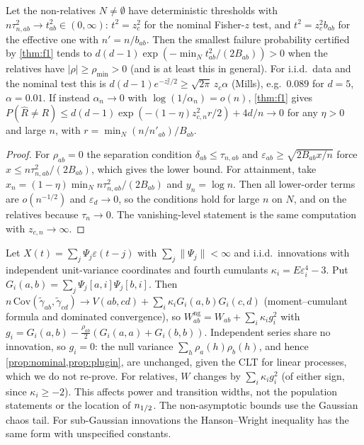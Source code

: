 \begin{proposition}\label{prop:f1scope}
Let the non-relatives $N\neq\emptyset$ have deterministic thresholds with $n\tau_{n,ab}^2\to t_{ab}^2\in(0,\infty)$:
$t^2=z_c^2$ for the nominal Fisher-$z$ test, and $t^2=z_c^2b_{ab}$ for the effective one with $n'=n/b_{ab}$. Then the
smallest failure probability certified by \cref{thm:f1} tends to $d(d{-}1)\exp(-\min_Nt_{ab}^2/(2B_{ab}))>0$ when the
relatives have $|\rho|\ge\rho_{\min}>0$ (and is at least this in general). For i.i.d.\ data and the nominal test this
is $d(d{-}1)e^{-z_c^2/2}\ge\sqrt{2\pi}\,z_c\alpha$ (Mills), e.g.\ $0.089$ for $d=5$, $\alpha=0.01$. If instead
$\alpha_n\to0$ with $\log(1/\alpha_n)=o(n)$, \cref{thm:f1} gives
$P(\hat R\ne R)\le d(d{-}1)\exp(-(1-\eta)z_{c,n}^2r/2)+4d/n\to0$ for any $\eta>0$ and large $n$, with
$r=\min_N(n/n'_{ab})/B_{ab}$.
\end{proposition}
\begin{proof}
For $\rho_{ab}=0$ the separation condition $\delta_{ab}\le\tau_{n,ab}$ and $\varepsilon_{ab}\ge\sqrt{2B_{ab}x/n}$ force
$x\le n\tau_{n,ab}^2/(2B_{ab})$, which gives the lower bound. For attainment, take
$x_n=(1-\eta)\min_Nn\tau_{n,ab}^2/(2B_{ab})$ and $y_n=\log n$. Then all lower-order terms are $o(n^{-1/2})$ and
$\varepsilon_d\to0$, so the conditions hold for large $n$ on $N$, and on the relatives because $\tau_n\to0$. The
vanishing-level statement is the same computation with $z_{c,n}\to\infty$.
\end{proof}

\begin{remark}\label{rem:nongauss}
Let $X(t)=\sum_j\Psi_j\varepsilon(t-j)$ with $\sum_j\|\Psi_j\|<\infty$ and i.i.d.\ innovations with independent
unit-variance coordinates and fourth cumulants $\kappa_i=E\varepsilon_i^4-3$. Put
$G_i(a,b)=\sum_j\Psi_j[a,i]\Psi_j[b,i]$. Then $n\,\mathrm{Cov}(\tilde\gamma_{ab},\tilde\gamma_{cd})\to
V(ab,cd)+\sum_i\kappa_iG_i(a,b)G_i(c,d)$ (moment--cumulant formula and dominated convergence), so
$W_{ab}^{\mathrm{ng}}=W_{ab}+\sum_i\kappa_ig_i^2$ with $g_i=G_i(a,b)-\frac{\rho_{ab}}2(G_i(a,a)+G_i(b,b))$. Independent
series share no innovation, so $g_i=0$: the null variance $\sum_h\rho_a(h)\rho_b(h)$, and hence
\cref{prop:nominal,prop:plugin}, are unchanged, given the CLT for linear processes, which we do not re-prove. For
relatives, $W$ changes by $\sum_i\kappa_ig_i^2$ (of either sign, since $\kappa_i\ge-2$). This affects power and
transition widths, not the population statements or the location of $n_{1/2}$. The non-asymptotic bounds use the
Gaussian chaos tail. For sub-Gaussian innovations the Hanson--Wright inequality
\citep[Thm.~1.1]{rudelson2013hanson} has the same form with unspecified constants.
\end{remark}

